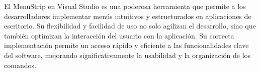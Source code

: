 El MenuStrip en Visual Studio es una poderosa herramienta que permite a los desarrolladores implementar menús intuitivos y estructurados en aplicaciones de escritorio. Su flexibilidad y facilidad de uso no solo agilizan el desarrollo, sino que también optimizan la interacción del usuario con la aplicación. Su correcta implementación permite un acceso rápido y eficiente a las funcionalidades clave del software, mejorando significativamente la usabilidad y la organización de los comandos.